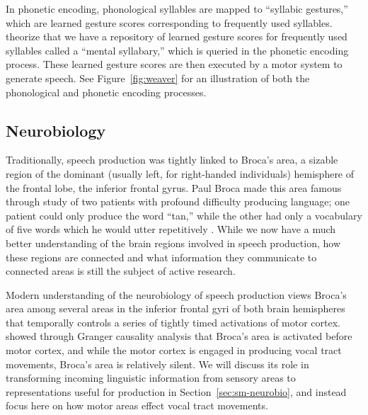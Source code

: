 In phonetic encoding,
phonological syllables are
mapped to ``syllabic gestures,''
which are learned gesture scores
corresponding to frequently used syllables.
\citet{levelt1992,levelt1994} theorize
that we have a repository
of learned gesture scores
for frequently used syllables
called a ``mental syllabary,''
which is queried
in the phonetic encoding process.
These learned gesture scores
are then executed by a motor system
to generate speech.
See Figure~\ref{fig:weaver}
for an illustration of both
the phonological
and phonetic encoding processes.


\subsection{Neurobiology}
\label{sec:prod-neurobio}

Traditionally, speech production
was tightly linked to Broca's area,
a sizable region of the dominant
(usually left, for right-handed individuals)
hemisphere of the frontal lobe,
the inferior frontal gyrus.
Paul Broca made this area famous
through study of two patients
with profound difficulty producing language;
one patient could only produce the word ``tan,''
while the other had only a vocabulary
of five words which he would utter repetitively
\citep{broca1861}.
While we now have a much better understanding
of the brain regions
involved in speech production,
how these regions are connected
and what information they communicate
to connected areas is still
the subject of active research.

Modern understanding of
the neurobiology of speech production
views Broca's area among several
areas in the inferior frontal gyri
of both brain hemispheres
that temporally controls a series
of tightly timed activations
of motor cortex.
\citet{flinker2015}
showed through Granger causality analysis
that Broca's area is activated
before motor cortex,
and while the motor cortex is
engaged in producing vocal tract movements,
Broca's area is relatively silent.
We will discuss its role in
transforming incoming linguistic
information from sensory areas
to representations useful for production
in Section~\ref{sec:sm-neurobio},
and instead focus here on
how motor areas effect vocal tract movements.

